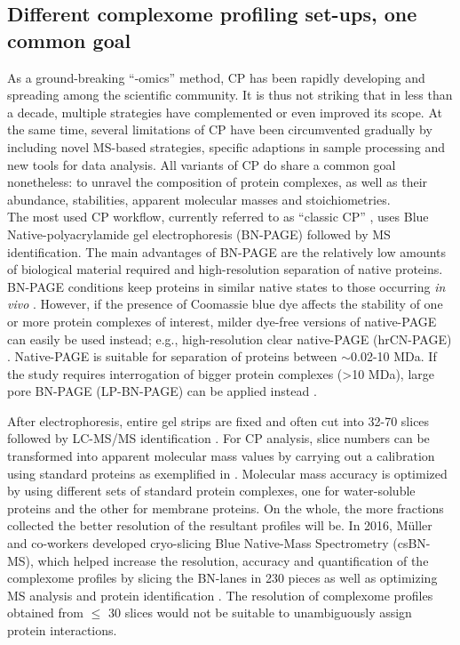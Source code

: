 \subsection*{Different complexome profiling set-ups, one common goal}\label{ssec:CP_MS_ssec1}
As a ground-breaking “-omics” method, CP has been rapidly developing and spreading among the scientific community. It is thus not striking that in less than a decade, multiple strategies have complemented or even improved its scope. At the same time, several limitations of CP have been circumvented gradually by including novel MS-based strategies, specific adaptions in sample processing and new tools for data analysis. All variants of CP do share a common goal nonetheless: to unravel the composition of protein complexes, as well as their abundance, stabilities, apparent molecular masses and stoichiometries.\\
The most used CP workflow, currently referred to as “classic CP” \cite{Wittig_2021}, uses Blue Native-polyacrylamide gel electrophoresis (BN-PAGE) followed by MS identification. The main advantages of BN-PAGE are the relatively low amounts of biological material required and high-resolution separation of native proteins. BN-PAGE conditions keep proteins in similar native states to those occurring \emph{in vivo} \cite{Wittig_2006}. However, if the presence of Coomassie blue dye affects the stability of one or more protein complexes of interest, milder dye-free versions of native-PAGE can easily be used instead; e.g., high-resolution clear native-PAGE (hrCN-PAGE) \cite{Ladig_2011, Wittig_2007}. Native-PAGE is suitable for separation of proteins between $\sim$0.02-10 MDa. If the study requires interrogation of bigger protein complexes (>10 MDa), large pore BN-PAGE (LP-BN-PAGE) can be applied instead \cite{Heide_2012, Strecker_2010}.

After electrophoresis, entire gel strips are fixed and often cut into 32-70 slices followed by LC-MS/MS identification \cite{Giese_2021, Heide_2012, Senkler_2017, Vidoni_2017}. For CP analysis, slice numbers can be transformed into apparent molecular mass values by carrying out a calibration using standard proteins as exemplified in \cite{Heide_2012, Wittig_2010}. Molecular mass accuracy is optimized by using different sets of standard protein complexes, one for water-soluble proteins and the other for membrane proteins. On the whole, the more fractions collected the better resolution of the resultant profiles will be. In 2016, Müller and co-workers developed cryo-slicing Blue Native-Mass Spectrometry (csBN-MS), which helped increase the resolution, accuracy and quantification of the complexome profiles by slicing the BN-lanes in 230 pieces as well as optimizing MS analysis and protein identification \cite{Muller_2016}. The resolution of complexome profiles obtained from \(\leq\) 30 slices would not be suitable to unambiguously assign protein interactions.


